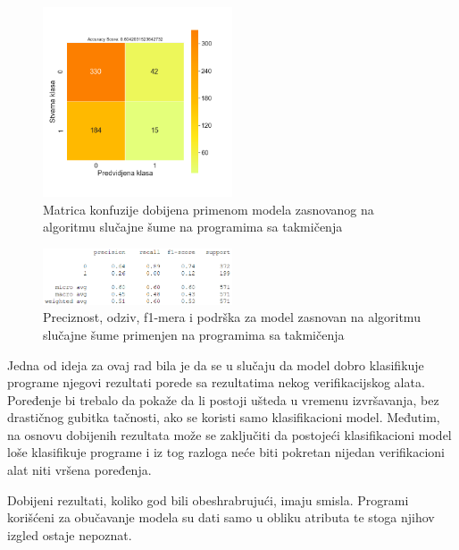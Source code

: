 \documentclass[12pt,oneside]{memoir}
\begin{document}
\begin{figure}[!ht]
  \centering
  \includegraphics[width=0.5\textwidth]{RF_c_files_confussion_matrix}
  \caption{Matrica konfuzije dobijena primenom modela zasnovanog na algoritmu slučajne šume na programima sa takmičenja}
  \label{fig:confmfinal}
\end{figure}

\begin{figure}[!ht]
  \centering
  \includegraphics[width=0.5\textwidth]{extra_final}
  \caption{Preciznost, odziv, f1-mera i podrška za model zasnovan na algoritmu slučajne šume primenjen na programima sa takmičenja}
  \label{fig:extrafinal}
\end{figure}

Jedna od ideja za ovaj rad bila je da se u slučaju da model dobro klasifikuje programe njegovi rezultati porede sa rezultatima nekog verifikacijskog alata. Poređenje bi trebalo da pokaže da li postoji ušteda u vremenu izvršavanja, bez drastičnog gubitka tačnosti, ako se koristi samo klasifikacioni model. Međutim, na osnovu dobijenih rezultata može se zaključiti da postojeći klasifikacioni model loše klasifikuje programe i iz tog razloga neće biti pokretan nijedan verifikacioni alat niti vršena poređenja.

Dobijeni rezultati, koliko god bili obeshrabrujući, imaju smisla. Programi korišćeni za obučavanje modela su dati samo u obliku atributa te stoga njihov izgled ostaje nepoznat. 
\end{document}
